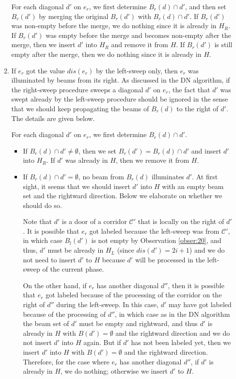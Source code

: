 \documentclass[english,runningheads,11pt]{llncs-revised}
\def\calC{\mathcal{C}}
\begin{document}
\begin{enumerate}
\begin{enumerate}
For each diagonal $d'$ on $e_r$,
we first determine $B_r(d)\cap d'$, and then set $B_r(d')$ by merging the
original $B_r(d')$ with $B_r(d)\cap d'$. If $B_r(d')$ was non-empty
before the merge, we do nothing since it is already in $H_R$.
If $B_r(d')$ was empty before the
merge and becomes non-empty after the merge, then we insert $d'$ into
$H_R$ and remove it from $H$.
If $B_r(d')$ is still empty after the merge, then we do nothing
since it is already in $H$.

\item
If $e_r$ got the value $dis(e_r)$ by the left-sweep only, then $e_r$
was illuminated by beams from its right. As discussed in the DN
algorithm, if the right-sweep procedure sweeps a diagonal $d'$ on $e_r$,
the fact that $d'$ was swept already by the left-sweep procedure
should be ignored in the sense that we should keep propagating the
beams of $B_r(d)$ to the right of $d'$. The details are given below.

For each diagonal $d'$ on $e_r$, we first determine $B_r(d)\cap d'$.

\begin{itemize}
\item
If $B_r(d)\cap d'\neq\emptyset$, then we set $B_r(d')=B_r(d)\cap d'$
and insert $d'$ into $H_R$. If $d'$ was already in $H$, then we remove
it from $H$.

\item
If $B_r(d)\cap d'=\emptyset$, no beam from $B_r(d)$ illuminates $d'$.
At first sight, it seems that we should insert $d'$ into $H$
with an empty beam set and the rightward direction.
Below we elaborate on whether we should do so.

Note that $d'$ is a door of a corridor $\calC'$ that is locally on the
right of $d'$.  It is possible that $e_r$ got labeled
because the left-sweep was from $\calC'$, in which case
$B_l(d')$ is not empty by Observation \ref{obser:20},
and thus, $d'$ must be already in $H_L$ (since $dis(d')=2i+1$)
and we do not need to insert $d'$ to $H$ because $d'$ will be processed in the left-sweep of the current phase.

On the other hand, if $e_r$ has another diagonal $d''$, then it is
possible that $e_r$ got labeled because of the processing of the
corridor on the right of $d''$ during the left-sweep. In this case, $d'$ may have got
labeled because of the processing of $d''$, in which case as in
the DN algorithm the beam set of $d'$ must be empty and rightward, and thus $d'$
is already in $H$ with $B(d')=\emptyset$ and the rightward direction and we do
not insert $d'$ into $H$ again. But if $d'$ has not been labeled yet,
then we insert $d'$ into $H$ with $B(d')=\emptyset$ and the rightward
direction. Therefore, for the case where $e_r$ has another diagonal
$d''$, if $d'$ is already in $H$, we do
nothing; otherwise we insert $d'$ to $H$.


\end{itemize}
\end{enumerate}
\end{enumerate}
\end{document}

